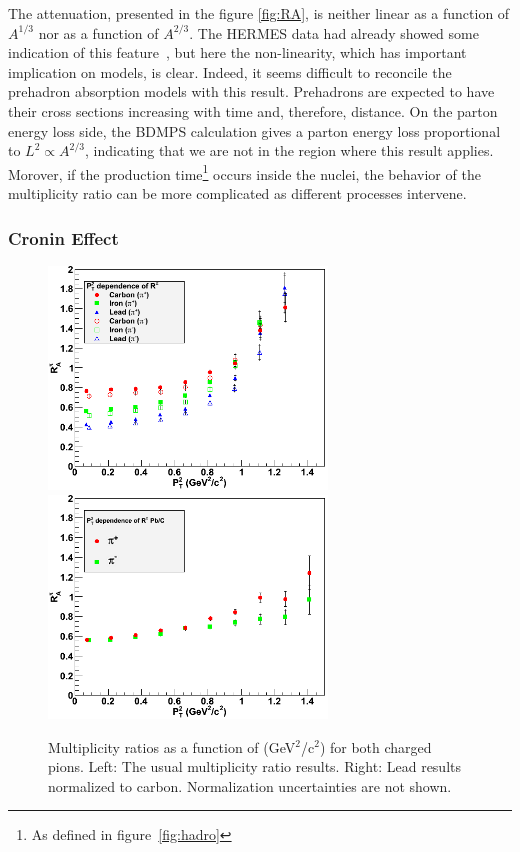 The attenuation, presented in the figure \ref{fig:RA}, is neither linear as a 
function of $A^{1/3}$ nor as a function of $A^{2/3}$. The HERMES data had
already showed some indication 
of this feature~\cite{Airapetian:2007vu,Airapetian:2009jy}, but here the 
non-linearity, which has important implication on models, is clear. Indeed, 
it seems difficult to reconcile the prehadron absorption models with this result. Prehadrons 
are expected to have their cross sections increasing with time and, therefore, 
distance. On the parton energy loss side, the BDMPS calculation gives a parton 
energy loss proportional to $L^2 \propto A^{2/3}$, indicating that we are not
in the region where this result applies. Morover, if the production 
time\footnote{As defined in figure~\ref{fig:hadro}} occurs 
inside the nuclei, the behavior of the multiplicity ratio can be more complicated
as different processes intervene.

\subsubsection{Cronin Effect}

\begin{figure}[p]
\centering
\includegraphics[width=7.4cm] {chap6-fig/F_RvPt.png} 
\includegraphics[width=7.4cm] {chap6-fig/F_RvPt_PbC.png} 
\caption {Multiplicity ratios as a function of \pt (GeV$^2$/c$^2$) for both charged pions. Left: The usual multiplicity ratio results. Right: Lead results normalized to carbon. Normalization uncertainties are not shown.}
\label{fig:RPt}
\end{figure}

